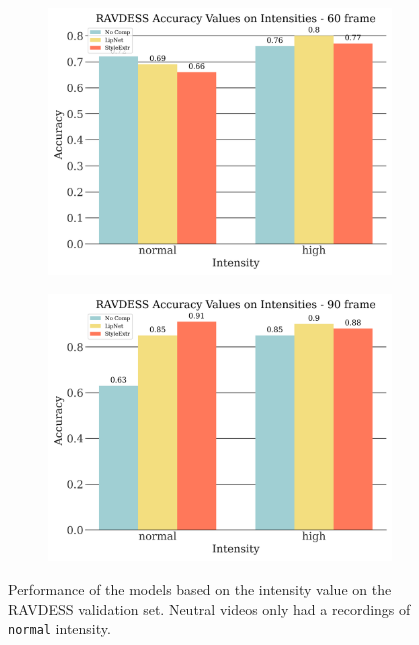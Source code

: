 \begin{figure}
\begin{subfigure}[b]{0.45\textwidth}
    \end{subfigure}
    \begin{subfigure}[b]{0.45\textwidth}
      \includegraphics[width=\textwidth]{res/rd-intensities-60.png}
    \end{subfigure}
    \begin{subfigure}[b]{0.45\textwidth}
      \includegraphics[width=\textwidth]{res/rd-intensities-90.png}
    \end{subfigure}
    \caption{Performance of the models based on the intensity value on the RAVDESS validation set. Neutral videos only had a recordings of \texttt{normal} intensity.}
    \label{fig:rd_intensity}
\end{figure}

